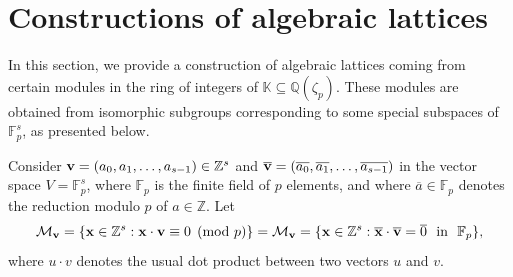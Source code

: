\documentclass{amsart}
\begin{document}

\section{Constructions of algebraic lattices} \label{sec-5}

In this section, we provide a construction of algebraic lattices coming from certain modules in the ring of integers of $\mathbb{K}\subseteq\mathbb{Q}(\zeta_p)$. These modules are obtained from isomorphic subgroups corresponding to some special subspaces of $\mathbb{F}_p^s$, as presented below.

Consider ${\bf v}=(a_0,a_1,\ldots,a_{s-1})\in \mathbb{Z}^s$
and $\overline{\bf v}=(\overline{a_0},\overline{a_1},\ldots,\overline{a_{s-1}})$ in the vector space $V=\mathbb{F}_{p}^s$, where $\mathbb{F}_p$ is the finite field of $p$ elements, and where $\overline{a}\in\mathbb{F}_p$ denotes the reduction modulo $p$ of $a\in\mathbb{Z}$. Let \[ \mathcal{M}_{\bf v} = \{{\bf x}\in\mathbb{Z}^s:{\bf x}\cdot{\bf v}\equiv 0\pmod p\} = \mathcal{M}_{\bf v} = \{{\bf x}\in\mathbb{Z}^s:\overline{\bf x}\cdot\overline{\bf v}=\overline{0} \ \ \mbox{in} \ \ \mathbb{F}_p\}, \] where  $u\cdot v$ denotes the usual dot product between two vectors $u$ and $v$.
\end{document}
